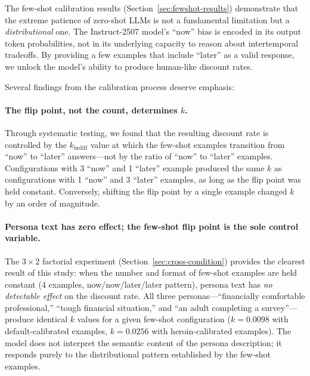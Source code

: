 \documentclass[11pt,a4paper]{article}
\begin{document}
The few-shot calibration results (Section~\ref{sec:fewshot-results}) demonstrate that the extreme patience of zero-shot LLMs is not a fundamental limitation but a \emph{distributional} one. The Instruct-2507 model's ``now'' bias is encoded in its output token probabilities, not in its underlying capacity to reason about intertemporal tradeoffs. By providing a few examples that include ``later'' as a valid response, we unlock the model's ability to produce human-like discount rates.

Several findings from the calibration process deserve emphasis:

\paragraph{The flip point, not the count, determines $k$.} Through systematic testing, we found that the resulting discount rate is controlled by the $k_{\text{indiff}}$ value at which the few-shot examples transition from ``now'' to ``later'' answers---not by the ratio of ``now'' to ``later'' examples. Configurations with 3 ``now'' and 1 ``later'' example produced the same $k$ as configurations with 1 ``now'' and 3 ``later'' examples, as long as the flip point was held constant. Conversely, shifting the flip point by a single example changed $k$ by an order of magnitude.

\paragraph{Persona text has zero effect; the few-shot flip point is the sole control variable.} The $3 \times 2$ factorial experiment (Section~\ref{sec:cross-condition}) provides the clearest result of this study: when the number and format of few-shot examples are held constant (4 examples, now/now/later/later pattern), persona text has \emph{no detectable effect} on the discount rate. All three personas---``financially comfortable professional,'' ``tough financial situation,'' and ``an adult completing a survey''---produce identical $k$ values for a given few-shot configuration ($k = 0.0098$ with default-calibrated examples, $k = 0.0256$ with heroin-calibrated examples). The model does not interpret the semantic content of the persona description; it responds purely to the distributional pattern established by the few-shot examples.
\end{document}
